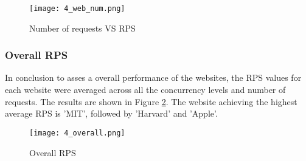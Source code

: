     \begin{figure}[H]
        \centering
        \texttt{[image: 4\_web\_num.png]}
        \caption{\small Number of requests VS RPS}
        \label{fig:4_web_num}
    \end{figure}

\subsubsection{Overall RPS}
In conclusion to asses a overall performance of the websites, the RPS values for each website were averaged across all the concurrency levels and
number of requests. The results are shown in Figure \ref{fig:4_overall}. The website achieving the highest average RPS is 'MIT', followed by 'Harvard'
and 'Apple'.

    \begin{figure}[H]
        \centering
        \texttt{[image: 4\_overall.png]}
        \caption{\small Overall RPS}
        \label{fig:4_overall}
    \end{figure}

